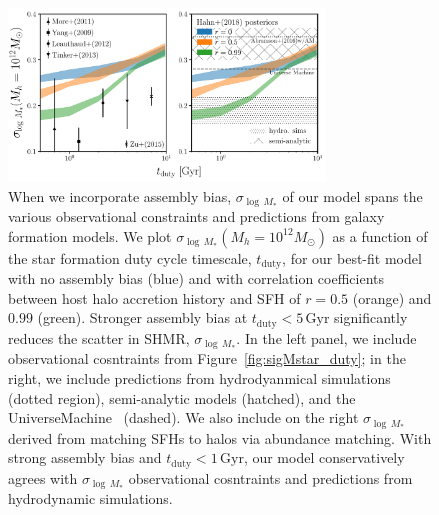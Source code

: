\documentclass[12pt, letterpaper, preprint, tighten]{aastex62}
\begin{document}
\begin{figure}
\begin{center}
\includegraphics[width=0.75\textwidth]{figs/SHMRscatter_tduty_abias2.pdf}
    \caption{When we incorporate assembly bias, $\sigma_{\log\,M_*}$ of our 
    model spans the various observational constraints and predictions from 
    galaxy formation models. We plot $\sigma_{\log\,M_*}(M_h=10^{12}M_\odot)$ 
    as a function of the star formation duty cycle timescale, $t_\mathrm{duty}$,
    for our best-fit model with no assembly bias (blue) and with correlation 
    coefficients between host halo accretion history and SFH of $r{=}0.5$ 
    (orange) and $0.99$ (green).  Stronger assembly bias at 
    $t_\mathrm{duty}{<}5\,\mathrm{Gyr}$ significantly reduces the scatter 
    in SHMR, $\sigma_{\log\,M_*}$. In the left panel, we include observational 
    cosntraints from Figure~\ref{fig:sigMstar_duty}; in the right, we include 
    predictions from hydrodyanmical simulations (dotted region), semi-analytic
    models (hatched), and the {\sc UniverseMachine}~\citep{behroozi2018a} 
    (dashed). We also include on the right $\sigma_{\log\,M_*}$ derived from 
    matching \cite{abramson2016} SFHs to halos via abundance matching.
    With strong assembly bias and $t_\mathrm{duty} < 1\,\mathrm{Gyr}$, our 
    model conservatively agrees with $\sigma_{\log\,M_*}$ observational 
    cosntraints and  predictions from hydrodynamic simulations. 
    }
\label{fig:sigMstar_duty_abias}
\end{center}
\end{figure}
\end{document}

